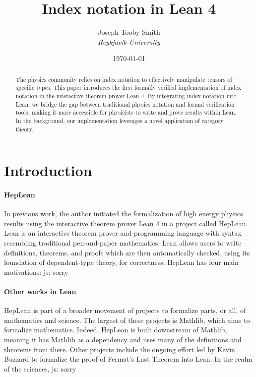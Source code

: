 \documentclass[a4paper, 11pt]{article}
\title{Index notation in Lean 4}
\author{Joseph Tooby-Smith \\ \textit{Reykjavik University}}
\date{\today}
\newcommand{\js}[1]{ {\color{magenta} js:  #1}}
\begin{document}
\maketitle
\vspace{-1cm}
\begin{abstract}
The physics community relies on index notation to effectively manipulate tensors of specific 
types. This paper introduces the first formally verified implementation of index notation in the
interactive theorem prover Lean 4. By integrating index notation into Lean, we bridge the gap between 
traditional physics notation and formal verification tools, 
making it more accessible for physicists to write and prove results within Lean.
In the background, our implementation leverages a novel application of category theory.
\end{abstract}

\section{Introduction}

\paragraph{HepLean} In previous work, the author initiated the formalization of high energy physics 
results using the interactive theorem prover Lean 4 in a project called HepLean. 
Lean is an interactive theorem prover and 
programming language with syntax resembling traditional pen-and-paper mathematics. 
Lean allows users to write definitions, theorems, and proofs 
which are then automatically checked, using its foundation of dependent-type theory, for correctness.
HepLean has four main motivations: \js{sorry}

\paragraph{Other works in Lean} HepLean is part of a broader movement of projects
to formalize parts, or all, of 
mathematics and science. The largest of these projects is Mathlib, which aims to formalize
mathematics. Indeed, HepLean is built downstream of Mathlib, meaning it has Mathlib as a 
dependency and uses many of the definitions and theorems from there. 
Other projects include the ongoing effort led by Kevin Buzzard to formalize the proof of Fermat's
Last Theorem into Lean. 
In the realm of the sciences, \js{sorry}
\end{document}
